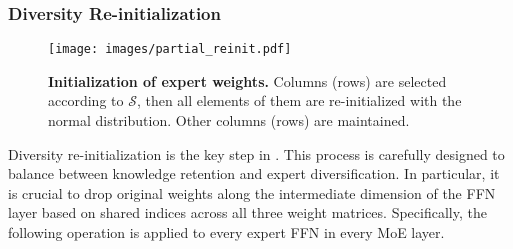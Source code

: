 




\subsubsection{Diversity Re-initialization}
\label{sec:reinit}


\begin{figure}[t]
\centering
\texttt{[image: images/partial\_reinit.pdf]}
\vskip -8pt
\caption{\textbf{Initialization of expert weights.} Columns (rows) are selected according to  $\mathcal{S}$, then all elements of them are re-initialized with the normal distribution. Other columns (rows) are maintained.}
\label{fig:partial-re-initialization}
\end{figure}




Diversity re-initialization is the key step in \methodname{}. 
This process is carefully designed to balance between knowledge retention and expert diversification. In particular, it is crucial to drop original weights along the intermediate dimension of the FFN layer based on shared indices across all three weight matrices. Specifically, the following operation is applied to every expert FFN in every MoE layer.




